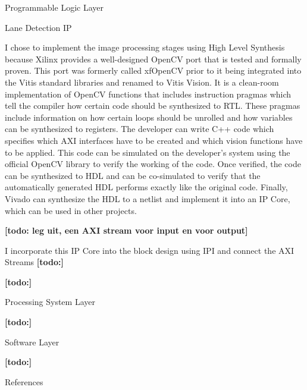 \documentclass{matthijs}
\begin{document}
	\begin{hoofdstuk}{Programmable Logic Layer}

		\begin{paragraaf}{Lane Detection IP}

			I chose to implement the image processing stages using High Level Synthesis because Xilinx provides a well-designed OpenCV port that is tested and formally proven.
			This port was formerly called xfOpenCV prior to it being integrated into the Vitis standard libraries and renamed to Vitis Vision.
			It is a clean-room implementation of OpenCV functions that includes instruction pragmas which tell the compiler how certain code should be synthesized to RTL.
			These pragmas include information on how certain loops should be unrolled and how variables can be synthesized to registers.
			The developer can write C++ code which specifies which AXI interfaces have to be created and which vision functions have to be applied.
			This code can be simulated on the developer's system using the official OpenCV library to verify the working of the code.
			Once verified, the code can be synthesized to HDL and can be co-simulated to verify that the automatically generated HDL performs exactly like the original code.
			Finally, Vivado can synthesize the HDL to a netlist and implement it into an IP Core, which can be used in other projects.
			

			\bigskip

			\textbf{[todo: leg uit, een AXI stream voor input en voor output]}

			\bigskip

			I incorporate this IP Core into the block design using IPI and connect the AXI Streams
			\textbf{[todo:]}

		\end{paragraaf}

		\textbf{[todo:]}

	\end{hoofdstuk}

	\begin{hoofdstuk}{Processing System Layer}

		\textbf{[todo:]}

	\end{hoofdstuk}
	
	\begin{hoofdstuk}{Software Layer}

		\textbf{[todo:]}

	\end{hoofdstuk}
	
	\begin{hoofdstuk}{References}

		\printbibliography[heading=none]

	\end{hoofdstuk}

	\clearpage
	\thispagestyle{empty}
	\addtocounter{page}{-1}
	\
	\clearpage
\end{document}
